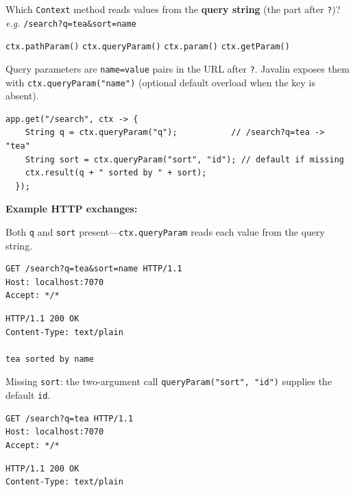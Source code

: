 \question[4]
Which \texttt{Context} method reads values from the \textbf{query string} (the part after \texttt{?})? \\
\textit{e.g.} \texttt{/search?q=tea\&sort=name}
\begin{choices}
  \choice \texttt{ctx.pathParam()}
  \CorrectChoice \texttt{ctx.queryParam()}
  \choice \texttt{ctx.param()} 
  \choice \texttt{ctx.getParam()}
\end{choices}
\begin{solution}
  Query parameters are \texttt{name=value} pairs in the URL after \texttt{?}. Javalin exposes them with \texttt{ctx.queryParam("name")} (optional default overload when the key is absent).

  \begin{lstlisting}[style=javaexam]
  app.get("/search", ctx -> {
    String q = ctx.queryParam("q");           // /search?q=tea -> "tea"
    String sort = ctx.queryParam("sort", "id"); // default if missing
    ctx.result(q + " sorted by " + sort);
  });
  \end{lstlisting}

  \noindent\textbf{Example HTTP exchanges:}\par
  \noindent Both \texttt{q} and \texttt{sort} present---\texttt{ctx.queryParam} reads each value from the query string.\par
  \begin{httpexchange}
\begin{lstlisting}[style=http]
GET /search?q=tea&sort=name HTTP/1.1
Host: localhost:7070
Accept: */*

\end{lstlisting}
\httpmidarrows
\begin{lstlisting}[style=http]
HTTP/1.1 200 OK
Content-Type: text/plain

tea sorted by name
\end{lstlisting}
  \end{httpexchange}

  \noindent Missing \texttt{sort}: the two-argument call \texttt{queryParam("sort", "id")} supplies the default \texttt{id}.\par
  \begin{httpexchange}
\begin{lstlisting}[style=http]
GET /search?q=tea HTTP/1.1
Host: localhost:7070
Accept: */*

\end{lstlisting}
\httpmidarrows
\begin{lstlisting}[style=http]
HTTP/1.1 200 OK
Content-Type: text/plain


\end{lstlisting}
\end{httpexchange}
\end{solution}
